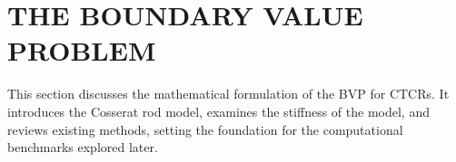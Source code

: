 \section{THE BOUNDARY VALUE PROBLEM}

This section discusses the mathematical formulation of the BVP for CTCRs. It introduces the Cosserat rod model, examines the stiffness of the model, and reviews existing methods, setting the foundation for the computational benchmarks explored later.

